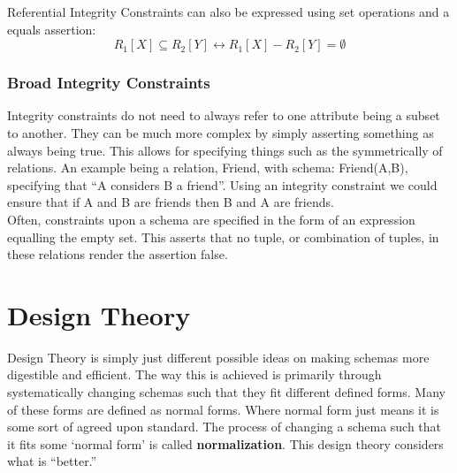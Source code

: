 \documentclass{report}
\begin{document}
      \begin{note}
        Referential Integrity Constraints can also be expressed using set operations and a equals assertion:
        \begin{equation*}
            R_1 [X] \subseteq R_2 [Y] \leftrightarrow R_1 [X] - R_2 [Y] = \emptyset
        \end{equation*}
      \end{note}


      \subsection{Broad Integrity Constraints}
        Integrity constraints do not need to always refer to one attribute being a subset to another. They can be much more complex by simply asserting something as always being true. This allows for specifying things such as the symmetrically of relations. An example being a relation, Friend, with schema: Friend(A,B), specifying that ``A considers B a friend''. Using an integrity constraint we could ensure that if A and B are friends then B and A are friends.
        \\
        
        
        Often, constraints upon a schema are specified in the form of an expression equalling the empty set. This asserts that no tuple, or combination of tuples, in these relations render the assertion false. 



        \chapter{Design Theory}

        Design Theory is simply just different possible ideas on making schemas more digestible and efficient. The way this is achieved is primarily through systematically changing schemas such that they fit different defined forms. Many of these forms are defined as normal forms. Where normal form just means it is some sort of agreed upon standard. The process of changing a schema such that it fits some `normal form' is called \textbf{normalization}. This design theory considers what is ``better.''
\end{document}
